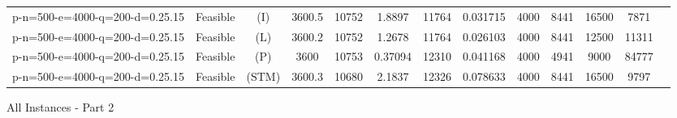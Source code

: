 \documentclass[landscape, a4paper]{article}
\newcommand{\STM}{\ensuremath{\mathrm{STM}}}
\newcommand{\Improved}{\ensuremath{\mathrm{I}}}
\newcommand{\Loose}{\ensuremath{\mathrm{L}}}
\newcommand{\Profit}{\ensuremath{\mathrm{P}}}
\begin{document}
\begin{center}
\begin{tabular}{lcccccccccccc}
p-n=500-e=4000-q=200-d=0.25.15 & Feasible & (\Improved) & 3600.5 & 10752 & 1.8897 & 11764 & 0.031715 & 4000 & 8441 & 16500 & 7871 & \\
p-n=500-e=4000-q=200-d=0.25.15 & Feasible & (\Loose) & 3600.2 & 10752 & 1.2678 & 11764 & 0.026103 & 4000 & 8441 & 12500 & 11311 & \\
p-n=500-e=4000-q=200-d=0.25.15 & Feasible & (\Profit) & 3600 & 10753 & 0.37094 & 12310 & 0.041168 & 4000 & 4941 & 9000 & 84777 & \\
p-n=500-e=4000-q=200-d=0.25.15 & Feasible & (\STM) & 3600.3 & 10680 & 2.1837 & 12326 & 0.078633 & 4000 & 8441 & 16500 & 9797 & \\
\end{tabular}
\end{center}
\begin{center}
All Instances - Part 2


\end{center}
\end{document}

